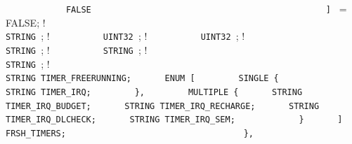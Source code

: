 {{\lstinline!            FALSE                                    ! \newline
\lstinline!          ] ! = FALSE;        ! \newline
\lstinline!                                                     ! \newline
\lstinline!          STRING !;             ! \newline
\lstinline!          UINT32 !;              ! \newline
\lstinline!          UINT32 !;   ! \newline
\lstinline!                                                     ! \newline
\lstinline!          STRING !;   ! \newline
\lstinline!          STRING !;   ! \newline
\lstinline!                                                     ! \newline
\lstinline!	     STRING !;       ! \newline
\lstinline!                                                     ! \newline
\lstinline!  ! \newline
\lstinline!	     STRING TIMER_FREERUNNING;! \newline
\lstinline!	     ENUM [! \newline
\lstinline!	       SINGLE {! \newline
\lstinline!	         STRING TIMER_IRQ;! \newline
\lstinline!	       },! \newline
\lstinline!	       MULTIPLE {! \newline
\lstinline!		 STRING TIMER_IRQ_BUDGET;! \newline
\lstinline!		 STRING TIMER_IRQ_RECHARGE;! \newline
\lstinline!		 STRING TIMER_IRQ_DLCHECK;! \newline
\lstinline!		 STRING TIMER_IRQ_SEM;! \newline
\lstinline!            }! \newline
\lstinline!	     ] FRSH_TIMERS;				! \newline
\lstinline!             ! \newline
\lstinline!        },                                           ! \newline
}}
